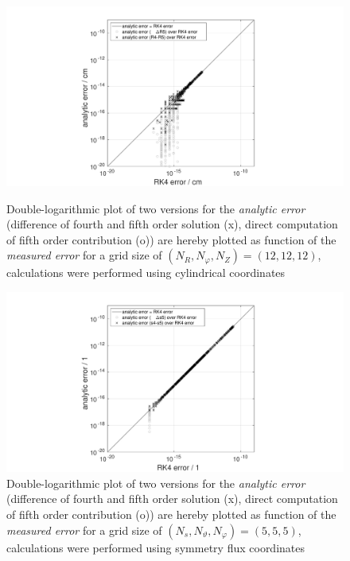 \documentclass[./main.tex]{subfiles}
\begin{document}
\begin{figure}[H]
\centering
\vspace{-0.5cm}
	\includegraphics[width=1.2\textwidth]{figures/RK4_alpha121212_cyl.pdf}
		\caption{Double-logarithmic plot of two versions for the \textit{analytic error} (difference of fourth and fifth order solution (x), direct computation of fifth order contribution (o)) are hereby plotted as function of the \textit{measured error} for a grid size of $(N_R,N_\varphi,N_Z) = (12,12,12)$, calculations were performed using cylindrical coordinates}  
	\label{fig:RK4_alpha121212_cyl}


	\includegraphics[width=1.2\textwidth]{figures/RK4_alpha555_SFC.pdf}
		\caption{Double-logarithmic plot of two versions for the \textit{analytic error} (difference of fourth and fifth order solution (x), direct computation of fifth order contribution (o)) are hereby plotted as function of the \textit{measured error} for a grid size of $(N_s,N_\vartheta,N_\varphi) = (5,5,5)$, calculations were performed using symmetry flux coordinates}  
	\label{fig:RK4_alpha555_SFC}
\vspace{-0.5cm}
 \hfill%
 \end{figure}
\end{document}
